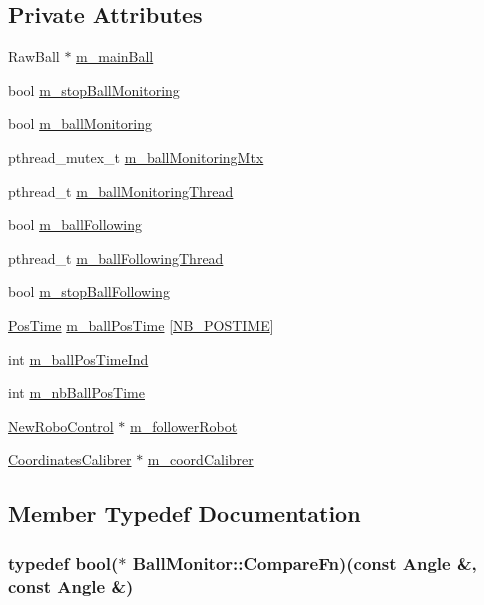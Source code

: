 \subsection*{Private Attributes}
\begin{DoxyCompactItemize}
\item 
RawBall $\ast$ \hyperlink{classBallMonitor_a4bd064999cb8ee1a286c8dd7ac11ce05}{m\_\-mainBall}
\item 
bool \hyperlink{classBallMonitor_a2486fa4296de6308930dc3864e05b61a}{m\_\-stopBallMonitoring}
\item 
bool \hyperlink{classBallMonitor_ac991e138d7e4ae238d2a68365c1caa68}{m\_\-ballMonitoring}
\item 
pthread\_\-mutex\_\-t \hyperlink{classBallMonitor_a5a9a84961419fefc7131d449bab07b0f}{m\_\-ballMonitoringMtx}
\item 
pthread\_\-t \hyperlink{classBallMonitor_a97247e5882aa1012dca3a84ba1350ffe}{m\_\-ballMonitoringThread}
\item 
bool \hyperlink{classBallMonitor_ada441cfbcbac3335a118348945e8b6c7}{m\_\-ballFollowing}
\item 
pthread\_\-t \hyperlink{classBallMonitor_af2b98e5dca99d4d2efc01330d84400d6}{m\_\-ballFollowingThread}
\item 
bool \hyperlink{classBallMonitor_a306a59cfa638a9e4a4c8b6881b5e7f91}{m\_\-stopBallFollowing}
\item 
\hyperlink{structBallMonitor_1_1PosTime}{PosTime} \hyperlink{classBallMonitor_ad20f7e0f913357a70ad2d5113bb7cb5b}{m\_\-ballPosTime} \mbox{[}\hyperlink{classBallMonitor_a6603291a8d6c6a2de7b378ece54d5e2b}{NB\_\-POSTIME}\mbox{]}
\item 
int \hyperlink{classBallMonitor_a2f93064edafac9ef59555ecc8d860e0f}{m\_\-ballPosTimeInd}
\item 
int \hyperlink{classBallMonitor_a80d4362976840374c4e5c207e6a38c86}{m\_\-nbBallPosTime}
\item 
\hyperlink{classNewRoboControl}{NewRoboControl} $\ast$ \hyperlink{classBallMonitor_a3411a0f9095e0d0e948a48b015ff1598}{m\_\-followerRobot}
\item 
\hyperlink{classCoordinatesCalibrer}{CoordinatesCalibrer} $\ast$ \hyperlink{classBallMonitor_addde606e4f6cd92dc43efd3342ce5f60}{m\_\-coordCalibrer}
\end{DoxyCompactItemize}


\subsection{Member Typedef Documentation}
\hypertarget{classBallMonitor_a5ad781c99d5b43bee7c838de9da75527}{
\subsubsection[{CompareFn}]{\setlength{\rightskip}{0pt plus 5cm}typedef bool($\ast$ {\bf BallMonitor::CompareFn})(const {\bf Angle} \&, const {\bf Angle} \&)}}
\label{classBallMonitor_a5ad781c99d5b43bee7c838de9da75527}


